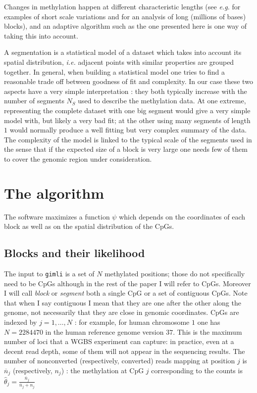 \documentclass[12pt]{amsart}
\newcommand{\gimli}{\texttt{gimli}}
\newcommand{\ie}{\textit{i.e.}}
\newcommand{\eg}{\textit{e.g.}}
\begin{document}
Changes in methylation happen at different characteristic lengths 
(see \eg{} \cite{methylseekr} for examples of short scale variations and
\cite{largeblocks} for an analysis of long (millions of bases) blocks), and
an adaptive algorithm such as the one presented here is one 
way of taking this into account.

A segmentation is a statistical model of a dataset  which 
takes into account its spatial distribution,
\ie{} adjacent points with similar properties are grouped together.
In general, when building a statistical model one tries to find a reasonable 
trade off between goodness of fit and complexity.
In our case these two aspects have a very simple interpretation : they both typically 
increase with the number of segments $N_S$ used to describe the 
methylation data.  
At one extreme, representing the complete dataset with one big segment would 
give a very simple model with, but likely a very bad fit;  
at the other using many segments of length $1$ would normally produce
a well fitting but very complex summary of the data.
The complexity of the model is linked to the typical scale of the segments used
in the sense that if the expected size of a block is very large one 
needs few of them to cover the genomic region under consideration.

\section{The algorithm}
The software maximizes  
a function $\psi$ which depends on the coordinates
of each block as well as on the spatial distribution of the CpGs.
\subsection{Blocks and their likelihood}
The  input to \gimli{} is a set of $N$ methylated positions;
those do not specifically need to be CpGs although
in the rest of the paper I will refer to CpGs. Moreover 
I will call {\em block} or {\em segment} 
both a single CpG or a set of contiguous CpGs. 
Note that when I say contiguous I mean that they are one
after the other along the genome, not necessarily that they are
close in genomic coordinates. CpGs are 
indexed by $j=1,\dots,N$ : for example, for human chromosome $1$ 
one has $N = 2284470$ in the human reference genome version $37$.
This is the maximum number of loci that a WGBS experiment can capture: 
in practice, even at a decent read depth,
some of them will not appear in the sequencing results. 
The number of nonconverted (respectively, converted) reads mapping at 
position $j$ is $\overline{n}_j$ (respectively, $n_j$) : the methylation
at CpG $j$ corresponding to the counts is $\hat{\theta}_j=\frac{\overline{n}_j}{\overline{n}_j+n_j}$
\end{document}
